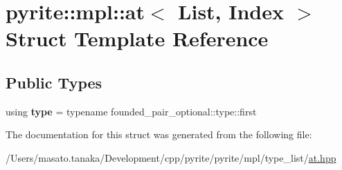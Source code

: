 \hypertarget{structpyrite_1_1mpl_1_1at}{}\section{pyrite\+:\+:mpl\+:\+:at$<$ List, Index $>$ Struct Template Reference}
\label{structpyrite_1_1mpl_1_1at}
\subsection*{Public Types}
\begin{DoxyCompactItemize}
\item 
\mbox{\label{structpyrite_1_1mpl_1_1at_a8bba5ea8c51859e7ba730264c20d7603}} 
using {\bfseries type} = typename founded\+\_\+pair\+\_\+optional\+::type\+::first
\end{DoxyCompactItemize}


The documentation for this struct was generated from the following file\+:\begin{DoxyCompactItemize}
\item 
/\+Users/masato.\+tanaka/\+Development/cpp/pyrite/pyrite/mpl/type\+\_\+list/\mbox{\hyperlink{at_8hpp}{at.\+hpp}}\end{DoxyCompactItemize}
